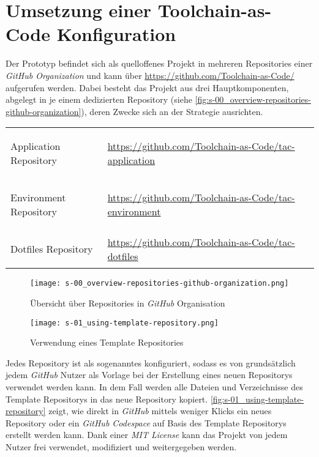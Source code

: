 \section{Umsetzung einer Toolchain-as-Code Konfiguration}
\label{sec:06-02_implementation-of-a-toolchain-as-code-configuration}

Der Prototyp befindet sich als quelloffenes Projekt in mehreren Repositories einer \textit{GitHub Organization} und kann über \url{https://github.com/Toolchain-as-Code/} aufgerufen werden. Dabei besteht das Projekt aus drei Hauptkomponenten, abgelegt in je einem dedizierten Repository (siehe \autoref{fig:s-00_overview-repositories-github-organization}), deren Zwecke sich an der  Strategie ausrichten.

\begin{table}[H]
    \centering
    \begin{tabular}{ >{\bfseries\raggedright}p{} >{}p{} }
        Application Repository &
        \url{https://github.com/Toolchain-as-Code/tac-application} \\
        Environment Repository &
        \url{https://github.com/Toolchain-as-Code/tac-environment} \\
        Dotfiles Repository &
        \url{https://github.com/Toolchain-as-Code/tac-dotfiles} \\
    \end{tabular}
\end{table}

\begin{figure}[h]
    \centering
    \texttt{[image: s-00\_overview-repositories-github-organization.png]}
    \caption{Übersicht über Repositories in \textit{GitHub} Organisation}
    \label{fig:s-00_overview-repositories-github-organization}
\end{figure}

\begin{wrapfigure}{r}{0.4\textwidth}
    \vspace{-20pt}
    \centering
    \texttt{[image: s-01\_using-template-repository.png]}
    \caption{Verwendung eines Template Repositories}
    \label{fig:s-01_using-template-repository}
    \vspace{-00pt}
\end{wrapfigure}

Jedes Repository ist als sogenanntes  konfiguriert, sodass es von grundsätzlich jedem \textit{GitHub} Nutzer als Vorlage bei der Erstellung eines neuen Repositorys verwendet werden kann. In dem Fall werden alle Dateien und Verzeichnisse des Template Repositorys in das neue Repository kopiert. \autoref{fig:s-01_using-template-repository} zeigt, wie direkt in \textit{GitHub} mittels weniger Klicks ein neues Repository oder ein \textit{GitHub Codespace} auf Basis des Template Repositorys erstellt werden kann. Dank einer \textit{MIT License} kann das Projekt von jedem Nutzer frei verwendet, modifiziert und weitergegeben werden.

